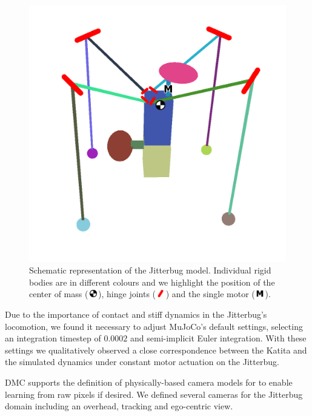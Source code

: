 \documentclass[letterpaper, 10 pt, conference]{ieeeconf}
\newcommand{\com}{\,\includegraphics[width=9pt]{ico-com}\,}
\newcommand{\hinge}{\,\includegraphics[width=9pt]{ico-hinge}\,}
\newcommand{\motor}{\,\includegraphics[width=9pt]{ico-motor}\,}
\begin{document}
\begin{figure}[h]
    \centering
    \includegraphics[width=\linewidth]{fig-jitterbug-parts}
    \caption[
        Schematic representation of the Jitterbug model.
        Individual rigid bodies are in different colours and we highlight the position of the center of mass, hinge joints and the single motor.
    ]{
        Schematic representation of the Jitterbug model.
        Individual rigid bodies are in different colours and we highlight the position of the center of mass (\protect\com), hinge joints  (\protect\hinge) and the single motor (\protect\motor).
    }
    \label{fig:parts}
\end{figure}

Due to the importance of contact and stiff dynamics in the Jitterbug's locomotion, we found it necessary to adjust MuJoCo's default settings, selecting an integration timestep of $0.0002$ and semi-implicit Euler integration.
With these settings we qualitatively observed a close correspondence between the Katita and the simulated dynamics under constant motor actuation on the Jitterbug.

DMC supports the definition of physically-based camera models for to enable learning from raw pixels if desired.
We defined several cameras for the Jitterbug domain including an overhead, tracking and ego-centric view.
\end{document}
